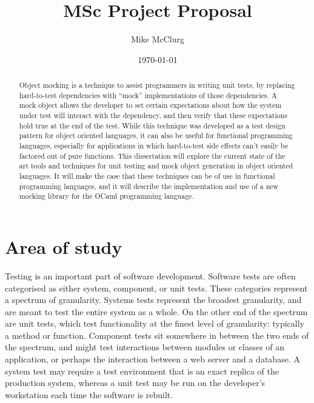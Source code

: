 \documentclass[proposal]{softeng}
\title{MSc Project Proposal}
\author{Mike McClurg}
\date{\today}
\begin{document}
\maketitle

\begin{abstract}


  Object mocking is a technique to assist programmers in writing unit
  tests, by replacing hard-to-test dependencies with ``mock''
  implementations of those dependencies. A mock object allows the
  developer to set certain expectations about how the system under
  test will interact with the dependency, and then verify that these
  expectations hold true at the end of the test. While this technique
  was developed as a test design pattern for object oriented
  languages, it can also be useful for functional programming
  languages, especially for applications in which hard-to-test side
  effects can't easily be factored out of pure functions. This
  dissertation will explore the current state of the art tools and
  techniques for unit testing and mock object generation in object
  oriented languages. It will make the case that these techniques can
  be of use in functional programming languages, and it will describe
  the implementation and use of a new mocking library for the OCaml
  programming language.


\end{abstract}

\section{Area of study}


Testing is an important part of software development. Software tests
are often categorised as either system, component, or unit
tests. These categories represent a spectrum of granularity. Systems
tests represent the broadest granularity, and are meant to test the
entire system as a whole. On the other end of the spectrum are unit
tests, which test functionality at the finest level of granularity:
typically a method or function. Component tests sit somewhere in
between the two ends of the spectrum, and might test interactions
between modules or classes of an application, or perhaps the
interaction between a web server and a database. A system test may
require a test environment that is an exact replica of the production
system, whereas a unit test may be run on the developer's workstation
each time the software is rebuilt.
\end{document}
